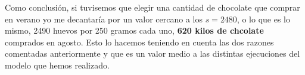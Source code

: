 \documentclass[11pt,a4paper]{article}
\begin{document}
Como conclusión, si tuvisemos que elegir una cantidad de chocolate que comprar en verano yo me decantaría por un valor cercano a los $s=2480$, o
lo que es lo mismo, 2490 huevos por 250 gramos cada uno, \textbf{620 kilos de chcolate} comprados en agosto. Esto lo hacemos teniendo en cuenta
las dos razones comentadas anteriormente y que es un valor medio a las distintas ejecuciones del modelo que hemos realizado.
\end{document}
